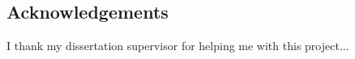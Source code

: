 \begin{center}
\section{Acknowledgements}
I thank my dissertation supervisor for helping me with this project...
\end{center}